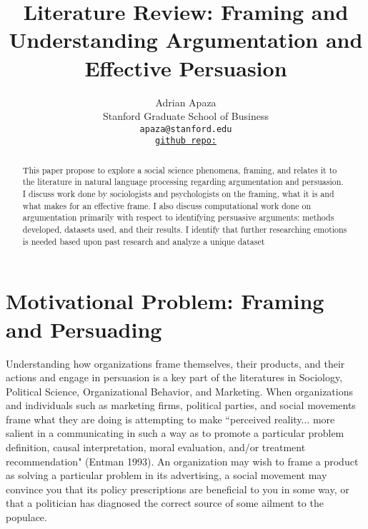 \documentclass[11pt,a4paper]{article}
\title{Literature Review: Framing and Understanding Argumentation and Effective Persuasion}
\author{Adrian Apaza \\
  Stanford Graduate School of Business \\
  \texttt{apaza@stanford.edu}\\
  \texttt{\href{http://www.latex-tutorial.com}{github repo:}}}
\date{}
\begin{document}
\maketitle
\begin{abstract}
This paper propose to explore a social science phenomena, framing, and relates it to the literature in natural language processing regarding argumentation and persuasion. I discuss work done by sociologists and psychologists on the framing, what it is and what makes for an effective frame. I also discuss computational work done on argumentation primarily with respect to identifying persuasive arguments: methods developed, datasets used, and their results. I identify that further researching emotions is needed based upon past research and analyze a unique dataset



\end{abstract}


\section{Motivational Problem: Framing and Persuading}



Understanding how organizations frame themselves, their products, and their actions and engage in persuasion is a key part of the literatures in Sociology, Political Science, Organizational Behavior, and Marketing. When organizations and individuals such as marketing firms, political parties, and social movements frame what they are doing is attempting to make ``perceived reality... more salient in a communicating in such a way as to promote a particular problem definition, causal interpretation, moral evaluation, and/or treatment recommendation" (Entman 1993). An organization may wish to frame a product as solving a particular problem in its advertising, a social movement may convince you that its policy prescriptions are beneficial to you in some way, or that a politician has diagnosed the correct source of some ailment to the populace.


\end{document}
